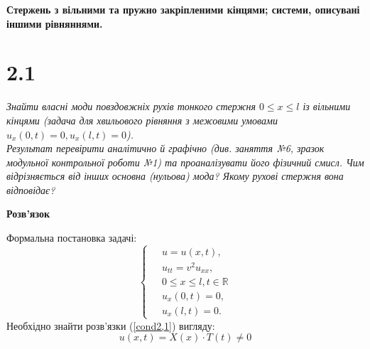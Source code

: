 

%


\textbf{\large Стержень з вільними та пружно закріпленими кінцями; системи, описувані іншими рівняннями.}

\section[Задача №2.1]{2.1}

\textit{Знайти власні моди повздовжніх рухів тонкого стержня $0 \leq x \leq l$ із вільними кінцями  (задача для хвильового рівняння з межовими умовами $u_x(0,t) = 0, u_x(l,t) = 0$).\\
Результат перевірити аналітично й графічно (див. заняття №6, зразок модульної контрольної роботи №1) та проаналізувати його фізичний смисл. Чим відрізняється від інших основна (нульова) мода? Якому рухові стержня вона відповідає?}

\begin{center}
    \large{\textbf{Розв'язок}}
\end{center}

\noindent Формальна постановка задачі:
\begin{equation} \label{cond2,1}
    \left\{ \begin{aligned} %
            \;&u = u(x,t), \\
            &u_{tt} = v^2 u_{xx}, \\
            &0 \leq x \leq l, t \in \mathbb{R} \\
            &u_x(0,t) = 0, \\
            &u_x(l,t) = 0. 
    \end{aligned} \right.
\end{equation}
Необхідно знайти розв'язки (\ref{cond2,1}) вигляду:
\begin{equation} \label{subst2,1}
    u(x,t) = X(x) \cdot T(t) \neq 0 
\end{equation}


